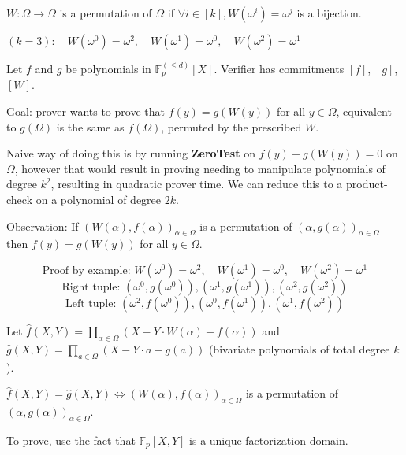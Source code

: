 \documentclass[../lecture-notes.tex]{subfiles}
\begin{document}
\begin{definition}
\(W : \Omega \rightarrow \Omega\) is a permutation of \(\Omega\) if \(\forall i \in [k], W(\omega^i) = \omega^{j}\) is a bijection.
\end{definition}

\begin{example}
 $(k=3): \quad W(\omega^0) = \omega^2, \quad W(\omega^1) = \omega^0, \quad W(\omega^2) = \omega^1$
\end{example}

Let \(f\) and \(g\) be polynomials in \(\mathbb{F}_p^{(\leq d)}[X]\). Verifier has commitments \([f]\), \([g]\), \([W]\).

\underline{Goal:} prover wants to prove that \(f(y) = g(W(y))\) for all \(y \in \Omega\), equivalent to \(g(\Omega)\) is the same as \(f(\Omega)\), permuted by the prescribed \(W\).

Naive way of doing this is by running \textbf{ZeroTest} on \(f(y) - g(W(y)) = 0\) on \(\Omega\), however that would result in proving needing to manipulate polynomials of degree \(k^2\), resulting in quadratic prover time. We can reduce this to a product-check on a polynomial of degree \(2k\).

\begin{remark}
Observation: If \((W(\alpha), f(\alpha))_{\alpha \in \Omega}\) is a permutation of \((\alpha, g(\alpha))_{\alpha \in \Omega}\) then \(f(y) = g(W(y))\) for all \(y \in \Omega \).
\end{remark}

\begin{example}
\[
\text{Proof by example: } W(\omega^0) = \omega^2, \quad W(\omega^1) = \omega^0, \quad W(\omega^2) = \omega^1 
\]
\[
\text{Right tuple: } (\omega^0, g(\omega^0)), (\omega^1, g(\omega^1)), (\omega^2, g(\omega^2))
\]
\[
\text{Left tuple: } (\omega^2, f(\omega^0)), (\omega^0, f(\omega^1)), (\omega^1, f(\omega^2))
\]
\end{example}

Let \(\hat{f}(X,Y) = \prod_{\alpha \in \Omega} (X - Y \cdot W(\alpha) - f(\alpha))\) and
\(\hat{g}(X,Y) = \prod_{a \in \Omega} (X - Y \cdot a - g(a))\) (bivariate polynomials of total degree \(k\)).

\begin{lemma}
\(\hat{f}(X,Y) = \hat{g}(X,Y) \iff \left( W(\alpha), f(\alpha) \right)_{\alpha \in \Omega}\) is a permutation of \(\left( \alpha, g(\alpha) \right)_{\alpha \in \Omega}\).

To prove, use the fact that \(\mathbb{F}_p[X,Y]\) is a unique factorization domain.
\end{lemma}
\end{document}

